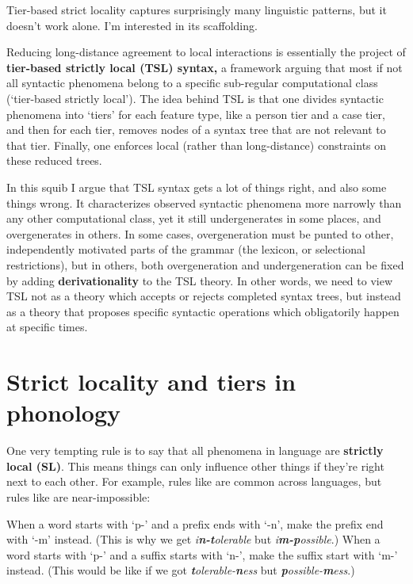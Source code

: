Tier-based strict locality captures surprisingly many linguistic patterns, but it doesn't work alone. I'm interested in its scaffolding.

Reducing long-distance agreement to local interactions is essentially the project of \textbf{tier-based strictly local (TSL) syntax,} a framework arguing that most if not all syntactic phenomena belong to a specific sub-regular computational class (‘tier-based strictly local’). The idea behind TSL is that one divides syntactic phenomena into ‘tiers’ for each feature type, like a person tier and a case tier, and then for each tier, removes nodes of a syntax tree that are not relevant to that tier. Finally, one enforces local (rather than long-distance) constraints on these reduced trees.

In this squib I argue that TSL syntax gets a lot of things right, and also some things wrong. It characterizes observed syntactic phenomena more narrowly than any other computational class, yet it still undergenerates in some places, and overgenerates in others. In some cases, overgeneration must be punted to other, independently motivated parts of the grammar (the lexicon, or selectional restrictions), but in others, both overgeneration and undergeneration can be fixed by adding \textbf{derivationality} to the TSL theory. In other words, we need to view TSL not as a theory which accepts or rejects completed syntax trees, but instead as a theory that proposes specific syntactic operations which obligatorily happen at specific times.

\section{Strict locality and tiers in phonology}

One very tempting rule is to say that all phenomena in language are \textbf{strictly local (SL)}. This means things can only influence other things if they're right next to each other. For example, rules like \Next[a] are common across languages, but rules like \Next[b] are near-impossible:

\pex \a When a word starts with `p-' and a prefix ends with `-n', make the prefix end with `-m' instead. (This is why we get \textit{i\textbf{n-t}olerable} but \textit{i\textbf{m-p}ossible}.)
    \a When a word starts with `p-' and a suffix starts with `n-', make the suffix start with `m-' instead. (This would be like if we got \textit{\textbf{t}olerable-\textbf{n}ess} but \textit{\textbf{p}ossible-\textbf{m}ess}.)
\xe

